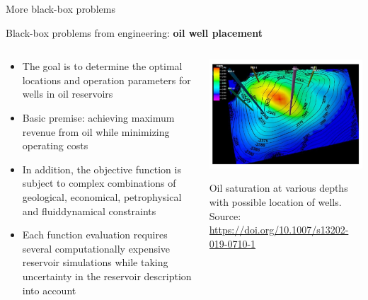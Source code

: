 \begin{vbframe}{More black-box problems}

Black-box problems from engineering: \textbf{oil well placement}
\vspace*{-0.1cm}
\begin{columns}
	\begin{column}{0.65\textwidth}
		\begin{itemize}
			\item The goal is to determine the optimal locations and operation parameters for wells in oil reservoirs
			\item Basic premise: achieving maximum revenue from oil while minimizing operating costs
			\item In addition, the objective function is subject to complex combinations of geological, economical, petrophysical and fluiddynamical constraints 
			\item Each function evaluation requires several computationally expensive reservoir simulations while taking uncertainty in the reservoir description into account 
		\end{itemize}
	\end{column}
	\begin{column}{0.35\textwidth}
		\begin{center}
			\includegraphics{figure_man/oil_well_problem.jpg}
			\begin{footnotesize}
				Oil saturation at various depths with possible location of wells.
				\newline
				\tiny{Source: \url{https://doi.org/10.1007/s13202-019-0710-1}}
			\end{footnotesize}
		\end{center}
	\end{column}
\end{columns}

\end{vbframe}
	


\endlecture

